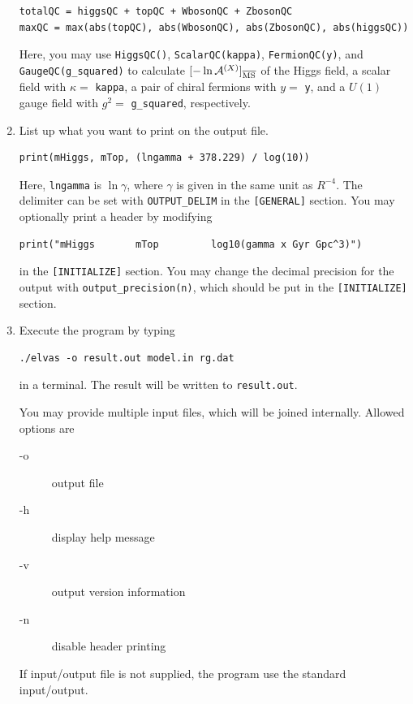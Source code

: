 \documentclass[12pt]{article}
\begin{document}
\begin{enumerate}
\begin{lstlisting}[basicstyle=\ttfamily\footnotesize, frame=single]
totalQC = higgsQC + topQC + WbosonQC + ZbosonQC
maxQC = max(abs(topQC), abs(WbosonQC), abs(ZbosonQC), abs(higgsQC))
\end{lstlisting}
Here, you may use
       \verb|HiggsQC()|, \verb|ScalarQC(kappa)|, \verb|FermionQC(y)|, and \verb|GaugeQC(g_squared)|
       to calculate $[-\ln\mathcal A^{(X)}]_{\rm \overline{MS}}$ of
       the Higgs field, a scalar field with $\kappa=$
       \verb|kappa|, a pair of chiral fermions with $y=$ \verb|y|, and a $U(1)$ gauge field with $g^2=$ \verb|g_squared|,
       respectively.
 \item List up what you want to print on the output file.
\begin{lstlisting}[basicstyle=\ttfamily\footnotesize, frame=single]
print(mHiggs, mTop, (lngamma + 378.229) / log(10))
\end{lstlisting}
       Here, \verb|lngamma| is $\ln\gamma$, where $\gamma$ is given in
       the same unit as $R^{-4}$. The delimiter can be set with
       \verb|OUTPUT_DELIM| in the \verb|[GENERAL]| section.  You may
       optionally print a header by modifying
\begin{lstlisting}[basicstyle=\ttfamily\footnotesize, frame=single]
print("mHiggs       mTop         log10(gamma x Gyr Gpc^3)")
\end{lstlisting}
       in the \verb|[INITIALIZE]| section. You may change the decimal
       precision for the output with \verb|output_precision(n)|, which
       should be put in the \verb|[INITIALIZE]| section.
 \item Execute the program by typing
\begin{lstlisting}[basicstyle=\ttfamily\footnotesize, frame=single]
./elvas -o result.out model.in rg.dat
\end{lstlisting}
       in a terminal.
       The result will be written to \verb|result.out|.
       
       You may provide multiple input files, which will be joined internally.
       Allowed options are
       \begin{description}
	\item[-o] output file
	\item[-h] display help message
        \item[-v] output version information
        \item[-n] disable header printing
       \end{description}
       If input/output file is not supplied, the program use the
       standard input/output.
\end{enumerate}
\end{document}

